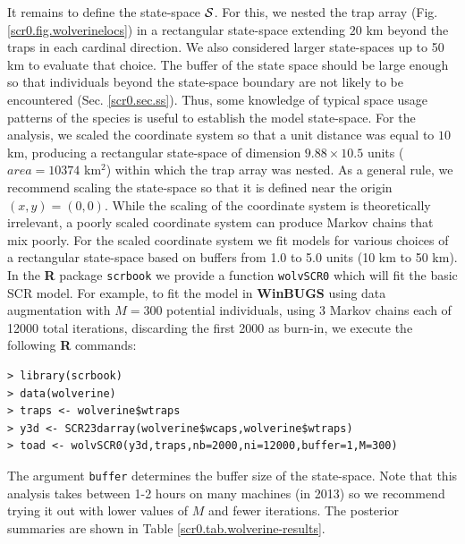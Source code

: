 It remains to define the
state-space ${\cal S}$. For this, we nested the trap array (Fig.
\ref{scr0.fig.wolverinelocs}) in a
 rectangular state-space extending $20$ km beyond the traps in each cardinal
direction.  We also considered larger state-spaces up to 50 km to
evaluate that choice.  The buffer of the state space should be large
enough so that individuals beyond the state-space boundary are not
likely to be encountered
(Sec. \ref{scr0.sec.ss}).
Thus, some knowledge of typical space usage
patterns of the species is useful to establish the model state-space.  For the analysis,
we scaled the coordinate system
so that a unit distance was equal to $10$ km, producing a rectangular
state-space of dimension $9.88 \times 10.5$ units ($area = 10374$ km$^2$)
within which the trap array was nested. As a general rule, we
recommend scaling the state-space so that it is defined near the
origin $(x,y)=(0,0)$. While the scaling of the coordinate system is
theoretically irrelevant, a poorly scaled coordinate system can
produce Markov chains that mix poorly.  For the scaled coordinate
system we fit models for various choices of a rectangular state-space
based on
buffers from 1.0 to 5.0 units (10 km to
50 km). In the {\bf R} package \mbox{\tt scrbook} we provide a
function
\mbox{\tt wolvSCR0} which will fit the basic SCR model. For
example, to fit the model in
{\bf WinBUGS} using data augmentation with $M=300$ potential individuals,
using 3 Markov chains each of 12000 total iterations, discarding the
first 2000 as burn-in, we execute the following {\bf R} commands:
{\small
\begin{verbatim}
> library(scrbook)
> data(wolverine)
> traps <- wolverine$wtraps
> y3d <- SCR23darray(wolverine$wcaps,wolverine$wtraps)
> toad <- wolvSCR0(y3d,traps,nb=2000,ni=12000,buffer=1,M=300)
\end{verbatim}
}
The argument \mbox{\tt buffer} determines the buffer size of the
state-space.  Note that this analysis takes between 1-2 hours on many
machines (in 2013) 
so we recommend trying it out with lower values of $M$ and
fewer iterations.  The posterior summaries are shown in
Table \ref{scr0.tab.wolverine-results}.

